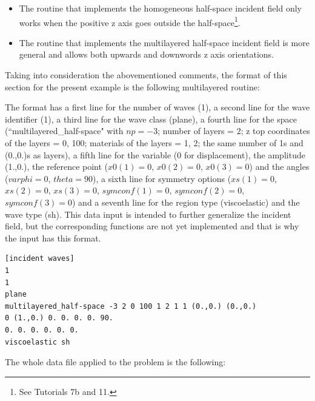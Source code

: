 \documentclass[a4]{article}
\begin{document}
\begin{itemize}
	\item The routine that implements the homogeneous half-space incident field only works when the positive z axis goes outside the half-space\footnote{See Tutorials 7b and 11.}.
	
	\item The routine that implements the multilayered half-space incident field is more general and allows both upwards and downwords z axis orientations.
\end{itemize}

Taking into consideration the abovementioned comments, the format of this section for the present example is the following multilayered routine:

The format has a first line for the number of waves (1), a second line for the wave identifier (1), a third line for the wave class (plane), a fourth line for the space (``multilayered\_half-space" with $np = -3$; number of layers = 2; z top coordinates of the layers = 0, 100; materials of the layers = 1, 2; the same number of 1s and (0.,0.)s as layers), a fifth line for the variable (0 for displacement), the amplitude (1.,0.), the reference point ($ x0(1) = 0 $, $ x0(2) = 0 $, $ x0(3) = 0 $)  and the angles ($ varphi = 0 $, $ theta = 90 $), a sixth line for symmetry options ($ xs(1) = 0 $, $ xs(2) = 0 $, $ xs(3) = 0 $, $ symconf(1) = 0 $, $ symconf(2) = 0 $, $ symconf(3) = 0 $) and a seventh line for the region type (viscoelastic) and the wave type (sh). This data input is intended to further generalize the incident field, but the corresponding functions are not yet implemented and that is why the input has this format. 

\begin{Verbatim}
[incident waves]
1
1
plane
multilayered_half-space -3 2 0 100 1 2 1 1 (0.,0.) (0.,0.)
0 (1.,0.) 0. 0. 0. 0. 90.
0. 0. 0. 0. 0. 0.
viscoelastic sh
\end{Verbatim}

The whole data file applied to the problem is the following:
\end{document}
